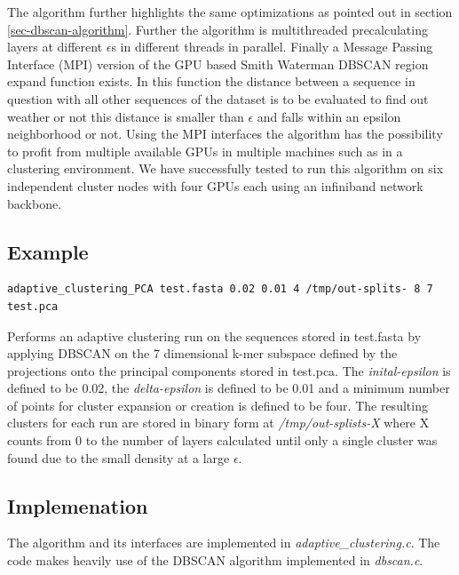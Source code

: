 The algorithm further highlights the same optimizations as pointed out
in section \ref{sec-dbscan-algorithm}. Further the algorithm is
multithreaded precalculating layers at different $\epsilon$s in
different threads in parallel.
Finally a Message Passing Interface (MPI) version of the GPU based
Smith Waterman DBSCAN region expand function exists. In this function
the distance between a sequence in question with all other sequences
of the dataset is to be evaluated to find out weather or not this
distance is smaller than $\epsilon$ and falls within an epsilon
neighborhood or not. Using the MPI interfaces the algorithm has the
possibility to profit from multiple available GPUs in multiple
machines such as in a clustering environment. We have successfully
tested to run this algorithm on six independent cluster nodes with
four GPUs each using an infiniband network backbone.

\subsection{Example}

\begin{lstlisting}
adaptive_clustering_PCA test.fasta 0.02 0.01 4 /tmp/out-splits- 8 7 test.pca 
\end{lstlisting}
Performs an adaptive clustering run on the sequences stored in
test.fasta by applying DBSCAN on the 7 dimensional k-mer subspace
defined by the projections onto the principal components stored in
test.pca. The \emph{inital-epsilon} is defined to be 0.02, the
\emph{delta-epsilon} is defined to be 0.01 and a minimum number of
points for cluster expansion or creation is defined to be four.
The resulting clusters for each run are stored in binary form at
\emph{/tmp/out-splists-X} where X counts from 0 to the number of
layers calculated until only a single cluster was found due to the
small density at a large $\epsilon$.

\subsection{Implemenation}
The algorithm and its interfaces are implemented in
\emph{adaptive\_clustering.c}. The code makes heavily use of the DBSCAN
algorithm implemented in \emph{dbscan.c}. 
